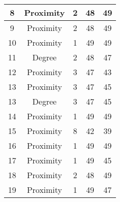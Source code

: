 \documentclass[results.tex]{subfiles}
\begin{document}
\begin{center}
\begin{tabular}{| c || c | c | c | c |}
            \hline
            8                       & Proximity                    & 2                      & 48                      & 49                   \\
            \hline
            9                       & Proximity                    & 2                      & 48                      & 49                   \\
            \hline
            10                      & Proximity                    & 1                      & 49                      & 49                   \\
            \hline
            11                      & Degree                       & 2                      & 48                      & 47                   \\
            \hline
            12                      & Proximity                    & 3                      & 47                      & 43                   \\
            \hline
            13                      & Proximity                    & 3                      & 47                      & 45                   \\
            \hline
            13                      & Degree                       & 3                      & 47                      & 45                   \\
            \hline
            14                      & Proximity                    & 1                      & 49                      & 49                   \\
            \hline
            15                      & Proximity                    & 8                      & 42                      & 39                   \\
            \hline
            16                      & Proximity                    & 1                      & 49                      & 49                   \\
            \hline
            17                      & Proximity                    & 1                      & 49                      & 45                   \\
            \hline
            18                      & Proximity                    & 2                      & 48                      & 49                   \\
            \hline
            19                      & Proximity                    & 1                      & 49                      & 47                   \\

\end{tabular}
\end{center}
\end{document}
